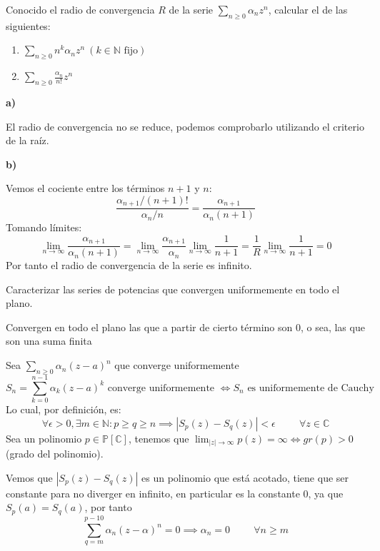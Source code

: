 \begin{ejer}
	Conocido el radio de convergencia $R$ de la serie $\sum_{n\geq 0} \alpha_nz^n$, calcular el de las siguientes:
	\begin{enumerate}[label=(\alph*)]
		\item $\sum_{n\geq 0} n^k\alpha_nz^n \ (k\in\mathbb{N} \text{ fijo})$
		\item $\sum_{n\geq0} \frac{\alpha_n}{n!}z^n$	
	\end{enumerate}
\end{ejer}
\begin{sol}

\textbf{a)}

El radio de convergencia no se reduce, podemos comprobarlo utilizando el criterio de la raíz.

\textbf{b)}

Vemos el cociente entre los términos $n+1$ y $n$:
$$ \frac{\alpha_{n+1}/(n+1)!}{\alpha_n/n} = \frac{\alpha_{n+1}}{\alpha_n (n+1)}$$
Tomando límites:
$$ \lim_{n\rightarrow\infty} \frac{\alpha_{n+1}}{\alpha_n (n+1)} = \lim_{n\rightarrow\infty}\frac{\alpha_{n+1}}{\alpha_n}\lim_{n\rightarrow\infty}\frac{1}{n+1} = \frac{1}{R} \lim_{n\rightarrow\infty}\frac{1}{n+1} = 0$$
Por tanto el radio de convergencia de la serie es infinito.
\end{sol}

\begin{ejer}
	Caracterizar las series de potencias que convergen uniformemente en todo el plano.
\end{ejer}
\begin{sol}

Convergen en todo el plano las que a partir de cierto término son 0, o sea, las que son una suma finita

Sea $\sum_{n\geq 0} \alpha_n (z-a)^n$ que converge uniformemente
$$S_n=\sum_{k=0}^{n-1} \alpha_k (z-a)^k \text{ \ converge uniformemente } \Longleftrightarrow S_n \text{ es uniformemente de Cauchy }$$
Lo cual, por definición, es:
$$\forall\epsilon>0,\exists m\in\mathbb{N}: p\geq q\geq n \implies |S_p(z)-S_q(z)| < \epsilon \hspace{1cm}\forall z\in\mathbb{C}$$
Sea un polinomio $p\in\mathbb{P}[\mathbb{C}]$, tenemos que $\lim_{|z|\rightarrow\infty} p(z) = \infty \Longleftrightarrow gr(p)>0$ (grado del polinomio).

Vemos que $|S_p(z)-S_q(z)|$ es un polinomio que está acotado, tiene que ser constante para no diverger en infinito, en particular es la constante $0$, ya que $S_p(a)=S_q(a)$, por tanto $$\sum_{q=m}^{p-10} \alpha_n (z-\alpha)^n = 0 \implies  \alpha_n=0 \hspace{1cm}\forall n\geq m$$ %

\end{sol}


